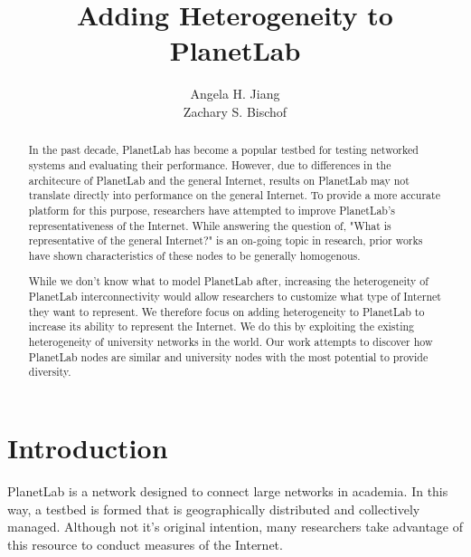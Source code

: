 \documentclass{sig-alternate-10pt}
\begin{document}
\title{Adding Heterogeneity to PlanetLab}

\author{
\alignauthor
Angela H. Jiang\\
\alignauthor
Zachary S. Bischof\\
}


\maketitle
\begin{abstract}

In the past decade, PlanetLab has become a popular testbed for testing
networked systems and evaluating their performance. However, due to differences
in the architecure of PlanetLab and the general Internet, results on PlanetLab
may not translate directly into performance on the general Internet.  To
provide a more accurate platform for this purpose, researchers have attempted
to improve PlanetLab's representativeness of the Internet. While answering the
question of, "What is representative of the general Internet?" is an on-going
topic in research, prior works have shown characteristics of these nodes to be
generally homogenous. 


While we don't know what to model PlanetLab after, increasing the heterogeneity
of PlanetLab interconnectivity would allow researchers to customize what type
of Internet they want to represent.  We therefore focus on adding heterogeneity
to PlanetLab to increase its ability to represent the Internet.  We do this by
exploiting the existing heterogeneity of university networks in the world. Our
work attempts to discover how PlanetLab nodes are similar and university nodes
with the most potential to provide diversity.

\end{abstract}

\section{Introduction}

PlanetLab is a network designed to connect large networks in academia. In this
way, a testbed is formed that is geographically distributed and collectively
managed. Although not it's original intention, many researchers take advantage
of this resource to conduct measures of the Internet.
\end{document}
